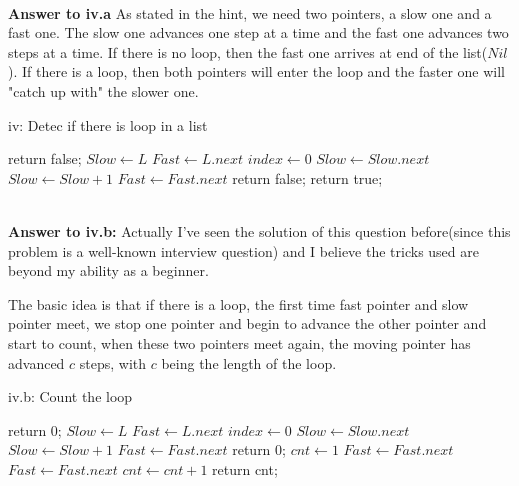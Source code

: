 \documentclass[a4paper,11pt]{article}
\theoremstyle{mytheor}
\begin{document}
\vspace{1.2in}

~\\

\noindent\textbf{Answer to iv.a}
As stated in the hint, we need two pointers, a slow one and a fast one. The slow one advances one step at a time and the fast one advances two steps at a time. If there is no loop, then the fast one arrives at end of the list($Nil$). If there is a loop, then both pointers will enter the loop and the faster one will "catch up with" the slower one.

\begin{algorithm}[H]
\caption{iv: Detec if there is loop in a list}\label{iv}
\begin{algorithmic}[1]
    \State return false;
  \Else
    \State $Slow \gets L$
    \State $Fast \gets L.next$
    \State $index \gets 0$
        \State $Slow \gets Slow.next$
      \EndIf
      \State $Slow \gets Slow + 1$
      \State $Fast \gets Fast.next$
    \EndWhile
      \State return false;
    \Else
      \State return true;
    \EndIf
  \EndIf
\EndProcedure
\end{algorithmic}
\end{algorithm}

\vspace{1.2in}

~\\

\noindent\textbf{Answer to iv.b:} Actually I've seen the solution of this question before(since this problem is a well-known interview question) and I believe the tricks used are beyond my ability as a beginner.

The basic idea is that if there is a loop, the first time fast pointer and slow pointer meet, we stop one pointer and begin to advance the other pointer and start to count, when these two pointers meet again, the moving pointer has advanced $c$ steps, with $c$ being the length of the loop.

\begin{algorithm}[H]
\caption{iv.b: Count the loop}\label{iv.b}
\begin{algorithmic}[1]
    \State return 0;
  \Else
    \State $Slow \gets L$
    \State $Fast \gets L.next$
    \State $index \gets 0$
        \State $Slow \gets Slow.next$
      \EndIf
      \State $Slow \gets Slow + 1$
      \State $Fast \gets Fast.next$
    \EndWhile
      \State return 0;
    \Else
      \State $cnt \gets 1$
      \State $Fast \gets Fast.next$
        \State $Fast \gets Fast.next$
        \State $cnt \gets cnt + 1$
      \EndWhile
      \State return cnt;
    \EndIf
  \EndIf
\EndProcedure
\end{algorithmic}
\end{algorithm}
\end{document}
